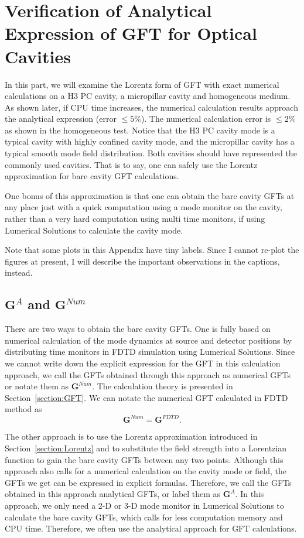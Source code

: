 \chapter[Verification of Analytical Expression of GFT]{Verification of Analytical Expression of GFT for Optical Cavities}\label{App:analyticalGF}
In this part, we will examine the Lorentz form of GFT with exact numerical calculations on a H3 PC cavity, a micropillar cavity and homogeneous medium. As shown later, if CPU time increases, the numerical calculation results approach the analytical expression (error $\leq 5\%$). The numerical calculation error is $\leq 2\%$ as shown in the homogeneous test. Notice that the H3 PC cavity mode is a typical cavity with highly confined cavity mode, and the micropillar cavity has a typical smooth mode field distribution. Both cavities should have represented the commonly used cavities. That is to say, one can safely use the Lorentz approximation for bare cavity GFT calculations.

One bonus of this approximation is that one can obtain the bare cavity GFTs at any place just with a quick computation using a mode monitor on the cavity, rather than a very hard computation using multi time monitors, if using Lumerical Solutions to calculate the cavity mode.

Note that some plots in this Appendix have tiny labels. Since I cannot re-plot the figures at present, I will describe the important observations in the captions, instead.

\section{$\mathbf{G}^{A}$ and $\mathbf{G}^{Num}$}
There are two ways to obtain the bare cavity GFTs. One is fully based on numerical calculation of the mode dynamics at source and detector positions by distributing time monitors in FDTD simulation using Lumerical Solutions. Since we cannot write down the explicit expression for the GFT in this calculation approach, we call the GFTs obtained through this approach as numerical GFTs or notate them as $\mathbf{G}^{Num}$. The calculation theory is presented in Section~\ref{section:GFT}.
We can notate the numerical GFT calculated in FDTD method as  \[\mathbf{G}^{Num}=\mathbf{G}^{FDTD}.\]

The other approach is to use the Lorentz approximation introduced in Section~\ref{section:Lorentz} and to substitute the field strength into a Lorentzian function to gain the bare cavity GFTs between any two points. Although this approach also calls for a numerical calculation on the cavity mode or field, the GFTs we get can be expressed in explicit formulas. Therefore, we call the GFTs obtained in this approach analytical GFTs, or label them as $\mathbf{G}^{A}$. In this approach, we only need a 2-D or 3-D mode monitor in Lumerical Solutions to calculate the bare cavity GFTs, which calls for less computation memory and CPU time. Therefore, we often use the analytical approach for GFT calculations.

